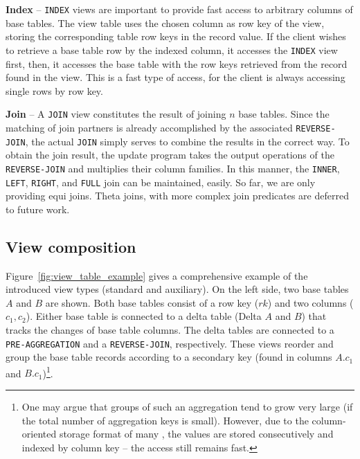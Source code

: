 \noindent
\textbf{Index} -- \texttt{INDEX} views are important to provide fast
access to arbitrary columns of base tables. The view table uses the
chosen column as row key of the view, storing the corresponding table
row keys in the record value. If the client wishes to retrieve a base
table row by the indexed column, it accesses the \texttt{INDEX} view
first, then, it accesses the base table with the row keys retrieved
from the record found in the view. This is a fast type of access, for
the client is always accessing single rows by row key. 

\noindent
\textbf{Join} -- A \texttt{JOIN} view constitutes the result of
joining $n$ base tables. Since the matching of join partners is
already accomplished by the associated \texttt{REVERSE-JOIN}, the
actual \texttt{JOIN} simply serves to combine the results in the
correct way.  To obtain the join result,
%
%
the update program takes the output operations of the
\texttt{REVERSE-JOIN} and multiplies their column families. In this
manner, the \texttt{INNER}, \texttt{LEFT}, \texttt{RIGHT}, and
\texttt{FULL} join can be maintained, easily. So far, we are only 
providing equi joins. Theta joins, with more complex join predicates
are deferred to future work.



\subsection{View composition}
\label{subsec:view_chain}


Figure~\ref{fig:view_table_example} gives a comprehensive example of
the introduced view types (standard and auxiliary). On the left side,
two base tables $A$ and $B$ are shown. Both base tables consist of a
row key ($rk$) and two columns ($c_1, c_2$). Either base table is
connected to a delta table (Delta $A$ and $B$) that tracks the changes
of base table columns. The delta tables are connected to a
\texttt{PRE-AGGREGATION} and a \texttt{REVERSE-JOIN}, respectively.
These views reorder and group the base table records according to a
secondary key (found in columns $A.c_1$ and $B.c_1$)\footnote{One may argue
that groups of such an aggregation tend to grow very large (if
the total number of aggregation keys is small). However, due to the
column-oriented storage format of many \KVS, the values are stored
consecutively and indexed by column key -- the access still remains
fast.}.

